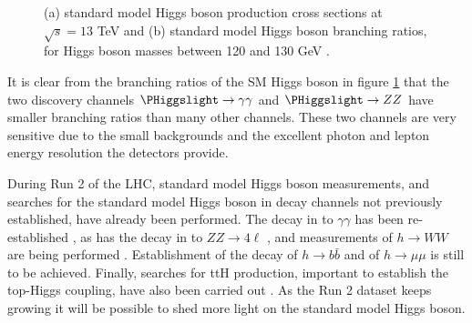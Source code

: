 \begin{figure}[h!]
\begin{center}
\end{center}
\caption{(a) standard model Higgs boson production cross sections at $\sqrt{s} = 13$ TeV and (b) standard model
Higgs boson branching ratios, for Higgs boson masses between 120 and 130 GeV \cite{YR4}.}
\label{fig:theory_smhxsbr}
\end{figure}

It is clear from the branching ratios of the \ac{SM} Higgs boson in figure \ref{fig:theory_smhxsbr}
that the two discovery channels $\PHiggslight \rightarrow \gamma\gamma$ and $\PHiggslight \rightarrow ZZ$
have smaller branching ratios than many other channels. These two channels are very sensitive
due to the small backgrounds and the excellent photon and lepton energy resolution the detectors provide.

During Run 2 of the LHC, standard model Higgs boson measurements, and searches for the 
standard model Higgs boson in decay channels not previously established, have 
already been performed. The decay in to $\gamma\gamma$ has been re-established \cite{CMSHgamgam2016,ATLASHgamgam2016},
as has the decay in to $ZZ\rightarrow 4\ell$ \cite{CMSHZZ2016,ATLASHZZ2016}, and measurements
of $h\rightarrow WW$ are being performed \cite{CMSHWW2016,ATLASHWW2016}. Establishment of the decay of 
$h\rightarrow b\bar{b}$ \cite{CMSVBFHbb2016,ATLASVHbb2016} and of $h\rightarrow \mu\mu$ \cite{ATLASHmm2016} 
is still to be achieved.
Finally, searches for ttH production, important to establish the top-Higgs coupling, have also been carried 
out \cite{CMSttH2016,CMSttHmultilep2016,ATLASttHbb2016,ATLASttHmultilep2016}. As the Run 2 dataset
keeps growing it will be possible to shed more light on the standard model Higgs boson.

